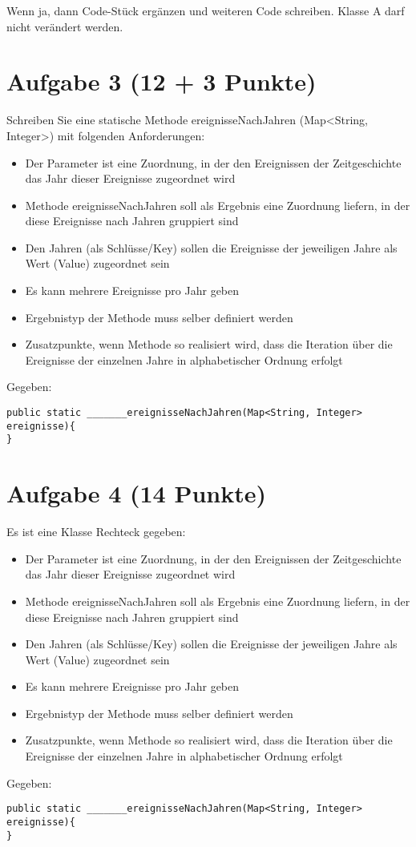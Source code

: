 Wenn ja, dann Code-Stück ergänzen und weiteren Code schreiben. Klasse A darf
nicht verändert werden.

\section{Aufgabe 3 (12 + 3 Punkte)}

Schreiben Sie eine statische Methode ereignisseNachJahren (Map<String,
Integer>) mit folgenden Anforderungen:

\begin{itemize}
    \item Der Parameter ist eine Zuordnung, in der den Ereignissen der Zeitgeschichte das
          Jahr dieser Ereignisse zugeordnet wird
    \item Methode ereignisseNachJahren soll als Ergebnis eine Zuordnung liefern, in der
          diese Ereignisse nach Jahren gruppiert sind
    \item Den Jahren (als Schlüsse/Key) sollen die Ereignisse der jeweiligen Jahre als
          Wert (Value) zugeordnet sein
    \item Es kann mehrere Ereignisse pro Jahr geben
    \item Ergebnistyp der Methode muss selber definiert werden
    \item Zusatzpunkte, wenn Methode so realisiert wird, dass die Iteration über die
          Ereignisse der einzelnen Jahre in alphabetischer Ordnung erfolgt
\end{itemize}

Gegeben:
\begin{lstlisting}
public static _______ereignisseNachJahren(Map<String, Integer> ereignisse){
}
\end{lstlisting}

\section{Aufgabe 4 (14 Punkte)}

Es ist eine Klasse Rechteck gegeben:

\begin{itemize}
    \item Der Parameter ist eine Zuordnung, in der den Ereignissen der Zeitgeschichte das
          Jahr dieser Ereignisse zugeordnet wird
    \item Methode ereignisseNachJahren soll als Ergebnis eine Zuordnung liefern, in der
          diese Ereignisse nach Jahren gruppiert sind
    \item Den Jahren (als Schlüsse/Key) sollen die Ereignisse der jeweiligen Jahre als
          Wert (Value) zugeordnet sein
    \item Es kann mehrere Ereignisse pro Jahr geben
    \item Ergebnistyp der Methode muss selber definiert werden
    \item Zusatzpunkte, wenn Methode so realisiert wird, dass die Iteration über die
          Ereignisse der einzelnen Jahre in alphabetischer Ordnung erfolgt
\end{itemize}

Gegeben:
\begin{lstlisting}
public static _______ereignisseNachJahren(Map<String, Integer> ereignisse){
}
\end{lstlisting}